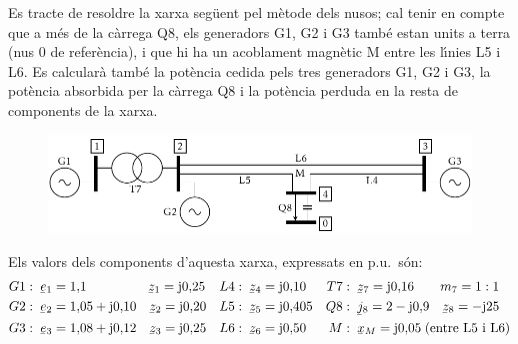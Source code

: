 \begin{exemple}
Es tracte de resoldre la xarxa seg\"{u}ent pel m\`{e}tode dels nusos; cal
tenir en compte que a m\'{e}s de la c\`{a}rrega Q8, els generadors G1, G2 i
G3 tamb\'{e} estan units a terra (nus 0 de refer\`{e}ncia), i que hi ha un
acoblament magn\`{e}tic M entre les l\'{\i}nies L5 i L6. Es calcular\`{a} tamb\'{e}
la pot\`{e}ncia cedida pels tres generadors G1, G2 i G3, la pot\`{e}ncia
absorbida per la c\`{a}rrega Q8 i la pot\`{e}ncia perduda en la resta de
components de la xarxa.
\begin{figure}[htb]
\vspace{3mm} \centering
   \includegraphics{Imatges/Cap-ResXarxElec-Exemple-Circuit.pdf}
\end{figure}

Els valors dels components d'aquesta xarxa, expressats en p.u.\ s\'{o}n:
\begin{align*}
   G1 &:\; \cmplx{e}_1 = 1{,}1 \qquad\qquad\;\;\, \cmplx{z}_1 = \ju 0{,}25 & L4 &:\; \cmplx{z}_4 = \ju 0{,}10 & T7 &:\; \cmplx{z}_7 = \ju 0{,}16 \quad\quad m_7=1:1\\
   G2 &:\; \cmplx{e}_2 = 1{,}05+\ju0{,}10 \quad \cmplx{z}_2 = \ju 0{,}20 & L5 &:\; \cmplx{z}_5 = \ju 0{,}405  & Q8 &:\; \cmplx{j}_8 = 2-\ju0{,}9 \quad \cmplx{z}_8 = -\ju25 \\
   G3 &:\; \cmplx{e}_3 = 1{,}08+\ju0{,}12 \quad \cmplx{z}_3 = \ju 0{,}25 & L6 &:\; \cmplx{z}_6 = \ju 0{,}50 & M &:\; \cmplx{x}_M = \ju0{,}05\; \text{(entre L5 i L6)}
\end{align*}


\end{exemple}
